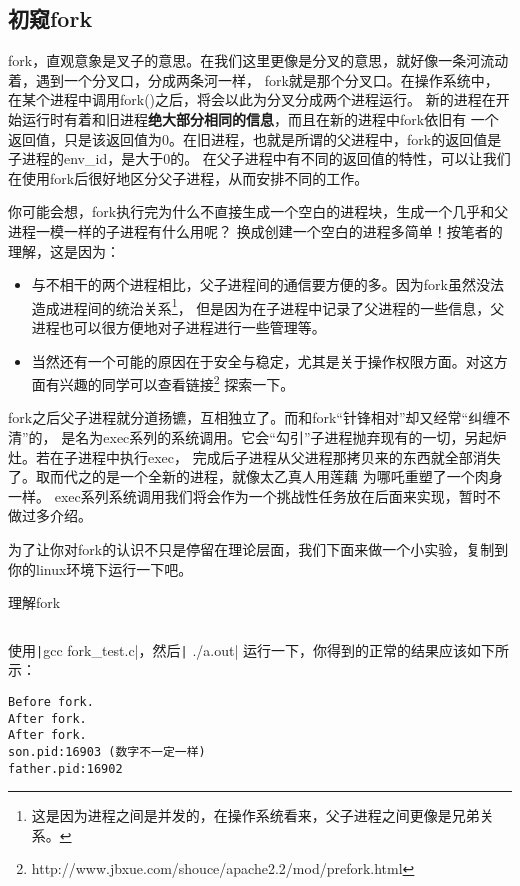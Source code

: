 \subsection{初窥fork}
fork，直观意象是叉子的意思。在我们这里更像是分叉的意思，就好像一条河流动着，遇到一个分叉口，分成两条河一样，
fork就是那个分叉口。在操作系统中，在某个进程中调用fork()之后，将会以此为分叉分成两个进程运行。
新的进程在开始运行时有着和旧进程\textbf{绝大部分相同的信息}，而且在新的进程中fork依旧有
一个返回值，只是该返回值为0。在旧进程，也就是所谓的父进程中，fork的返回值是子进程的env\_id，是大于0的。
在父子进程中有不同的返回值的特性，可以让我们在使用fork后很好地区分父子进程，从而安排不同的工作。

你可能会想，fork执行完为什么不直接生成一个空白的进程块，生成一个几乎和父进程一模一样的子进程有什么用呢？
换成创建一个空白的进程多简单！按笔者的理解，这是因为：
\begin{itemize}
 \item 与不相干的两个进程相比，父子进程间的通信要方便的多。因为fork虽然没法造成进程间的统治关系\footnote{这是因为进程之间是并发的，在操作系统看来，父子进程之间更像是兄弟关系。}，
但是因为在子进程中记录了父进程的一些信息，父进程也可以很方便地对子进程进行一些管理等。
 \item  当然还有一个可能的原因在于安全与稳定，尤其是关于操作权限方面。对这方面有兴趣的同学可以查看链接\footnote{http://www.jbxue.com/shouce/apache2.2/mod/prefork.html}
探索一下。
\end{itemize}

fork之后父子进程就分道扬镳，互相独立了。而和fork“针锋相对”却又经常“纠缠不清”的，
是名为exec系列的系统调用。它会“勾引”子进程抛弃现有的一切，另起炉灶。若在子进程中执行exec，
完成后子进程从父进程那拷贝来的东西就全部消失了。取而代之的是一个全新的进程，就像太乙真人用莲藕
为哪吒重塑了一个肉身一样。
exec系列系统调用我们将会作为一个挑战性任务放在后面来实现，暂时不做过多介绍。

为了让你对fork的认识不只是停留在理论层面，我们下面来做一个小实验，复制到你的linux环境下运行一下吧。
\begin{codeBoxWithCaption}{理解fork\label{code:fork_test.c}}
  \inputminted[linenos]{c}{codes/fork_test.c}
\end{codeBoxWithCaption}

使用\texttt|gcc fork_test.c|，然后\texttt| ./a.out| 运行一下，你得到的正常的结果应该如下所示：
\begin{verbatim}
Before fork.
After fork.
After fork.
son.pid:16903 (数字不一定一样)
father.pid:16902
\end{verbatim}

